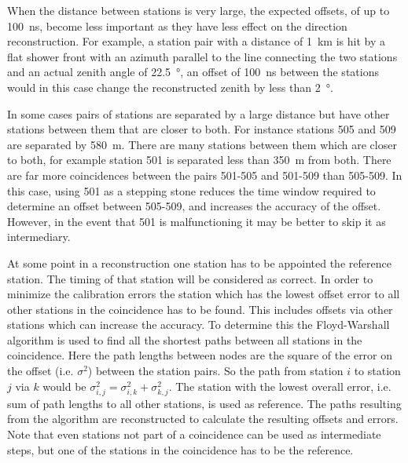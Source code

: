 When the distance between stations is very large, the expected \gps offsets, of up to \SI{100}{\ns}, become less important as they have less effect on the direction reconstruction. For example, a station pair with a distance of \SI{1}{\kilo\meter} is hit by a flat shower front with an azimuth parallel to the line connecting the two stations and an actual zenith angle of \SI{22.5}{\degree}, an offset of \SI{100}{\ns} between the stations would in this case change the reconstructed zenith by less than \SI{2}{\degree}.

In some cases pairs of stations are separated by a large distance but have other stations between them that are closer to both. For instance stations 505 and 509 are separated by \SI{580}{\meter}. There are many stations between them which are closer to both, for example station 501 is separated less than \SI{350}{\meter} from both. There are far more coincidences between the pairs 501-505 and 501-509 than 505-509. In this case, using 501 as a stepping stone reduces the time window required to determine an offset between 505-509, and increases the accuracy of the offset. However, in the event that 501 is malfunctioning it may be better to skip it as intermediary.

At some point in a reconstruction one station has to be appointed the reference station. The timing of that station will be considered as correct. In order to minimize the calibration errors the station which has the lowest offset error to all other stations in the coincidence has to be found. This includes offsets via other stations which can increase the accuracy. To determine this the Floyd-Warshall algorithm \cite{floyd1962algorithm} is used to find all the shortest paths between all stations in the coincidence. Here the path lengths between nodes are the square of the error on the offset (i.e. $\sigma^2$) between the station pairs. So the path from station $i$ to station $j$ via $k$ would be $\sigma_{i,j}^2 = \sigma_{i,k}^2 + \sigma_{k,j}^2$. The station with the lowest overall error, i.e. sum of path lengths to all other stations, is used as reference. The paths resulting from the algorithm are reconstructed to calculate the resulting offsets and errors. Note that even stations not part of a coincidence can be used as intermediate steps, but one of the stations in the coincidence has to be the reference.

